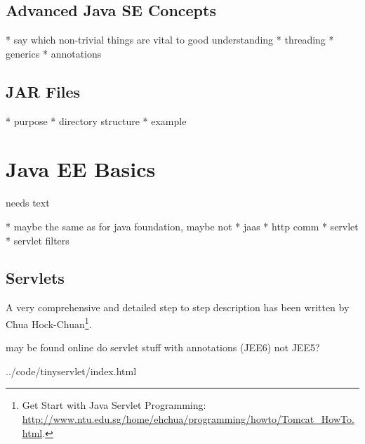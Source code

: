 \documentclass[a4paper,10pt,twoside]{book}
\begin{document}
\subsection{Advanced Java SE Concepts}

  * say which non-trivial things are vital to good understanding
  * threading
  * generics
  * annotations
  
\subsection{JAR Files}

  * purpose
  * directory structure
  * example

\section{Java EE Basics}


needs text

  * maybe the same as for java foundation, maybe not
  * jaas
  * http comm
  * servlet
  * servlet filters

\subsection{Servlets}

A very comprehensive and detailed step to step description has been written by Chua Hock-Chuan\footnote{
Get Start with Java Servlet Programming: \url{http://www.ntu.edu.sg/home/ehchua/programming/howto/Tomcat_HowTo.html}.
}.

may be found online do servlet stuff with annotations (JEE6) not JEE5?


{../code/tinyservlet/index.html}
\end{document}
